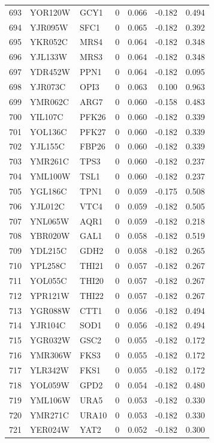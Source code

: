 \begin{longtable}{rllrrrr}
693 & YOR120W & GCY1 & 0 & 0.066 & -0.182 & 0.494\\
694 & YJR095W & SFC1 & 0 & 0.065 & -0.182 & 0.392\\
695 & YKR052C & MRS4 & 0 & 0.064 & -0.182 & 0.348\\
696 & YJL133W & MRS3 & 0 & 0.064 & -0.182 & 0.348\\
697 & YDR452W & PPN1 & 0 & 0.064 & -0.182 & 0.095\\
698 & YJR073C & OPI3 & 0 & 0.063 & 0.100 & 0.963\\
699 & YMR062C & ARG7 & 0 & 0.060 & -0.158 & 0.483\\
700 & YIL107C & PFK26 & 0 & 0.060 & -0.182 & 0.339\\
701 & YOL136C & PFK27 & 0 & 0.060 & -0.182 & 0.339\\
702 & YJL155C & FBP26 & 0 & 0.060 & -0.182 & 0.339\\
703 & YMR261C & TPS3 & 0 & 0.060 & -0.182 & 0.237\\
704 & YML100W & TSL1 & 0 & 0.060 & -0.182 & 0.237\\
705 & YGL186C & TPN1 & 0 & 0.059 & -0.175 & 0.508\\
706 & YJL012C & VTC4 & 0 & 0.059 & -0.182 & 0.505\\
707 & YNL065W & AQR1 & 0 & 0.059 & -0.182 & 0.218\\
708 & YBR020W & GAL1 & 0 & 0.058 & -0.182 & 0.519\\
709 & YDL215C & GDH2 & 0 & 0.058 & -0.182 & 0.265\\
710 & YPL258C & THI21 & 0 & 0.057 & -0.182 & 0.267\\
711 & YOL055C & THI20 & 0 & 0.057 & -0.182 & 0.267\\
712 & YPR121W & THI22 & 0 & 0.057 & -0.182 & 0.267\\
713 & YGR088W & CTT1 & 0 & 0.056 & -0.182 & 0.494\\
714 & YJR104C & SOD1 & 0 & 0.056 & -0.182 & 0.494\\
715 & YGR032W & GSC2 & 0 & 0.055 & -0.182 & 0.172\\
716 & YMR306W & FKS3 & 0 & 0.055 & -0.182 & 0.172\\
717 & YLR342W & FKS1 & 0 & 0.055 & -0.182 & 0.172\\
718 & YOL059W & GPD2 & 0 & 0.054 & -0.182 & 0.480\\
719 & YML106W & URA5 & 0 & 0.053 & -0.182 & 0.330\\
720 & YMR271C & URA10 & 0 & 0.053 & -0.182 & 0.330\\
721 & YER024W & YAT2 & 0 & 0.052 & -0.182 & 0.300\\

\end{longtable}
